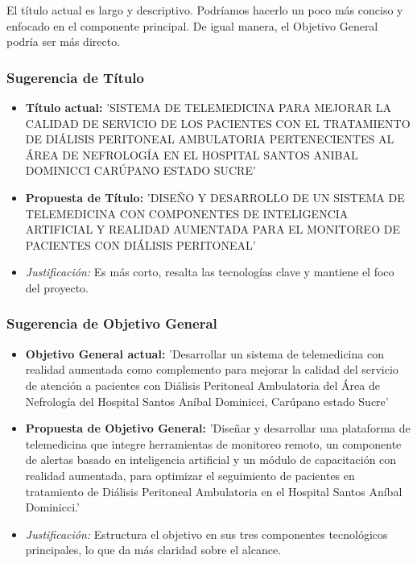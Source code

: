 \documentclass{article}
\begin{document}
El título actual es largo y descriptivo. Podríamos hacerlo un poco más conciso y enfocado en el componente principal. De igual manera, el Objetivo General podría ser más directo.

\subsubsection{Sugerencia de Título}
\begin{itemize}
    \item \textbf{Título actual:} 'SISTEMA DE TELEMEDICINA PARA MEJORAR LA CALIDAD DE SERVICIO DE LOS PACIENTES CON EL TRATAMIENTO DE DIÁLISIS PERITONEAL AMBULATORIA PERTENECIENTES AL ÁREA DE NEFROLOGÍA EN EL HOSPITAL SANTOS ANIBAL DOMINICCI CARÚPANO ESTADO SUCRE'
    \item \textbf{Propuesta de Título:} 'DISEÑO Y DESARROLLO DE UN SISTEMA DE TELEMEDICINA CON COMPONENTES DE INTELIGENCIA ARTIFICIAL Y REALIDAD AUMENTADA PARA EL MONITOREO DE PACIENTES CON DIÁLISIS PERITONEAL'
    \item \textit{Justificación:} Es más corto, resalta las tecnologías clave y mantiene el foco del proyecto.
\end{itemize}

\subsubsection{Sugerencia de Objetivo General}
\begin{itemize}
    \item \textbf{Objetivo General actual:} 'Desarrollar un sistema de telemedicina con realidad aumentada como complemento para mejorar la calidad del servicio de atención a pacientes con Diálisis Peritoneal Ambulatoria del Área de Nefrología del Hospital Santos Aníbal Dominicci, Carúpano estado Sucre'
    \item \textbf{Propuesta de Objetivo General:} 'Diseñar y desarrollar una plataforma de telemedicina que integre herramientas de monitoreo remoto, un componente de alertas basado en inteligencia artificial y un módulo de capacitación con realidad aumentada, para optimizar el seguimiento de pacientes en tratamiento de Diálisis Peritoneal Ambulatoria en el Hospital Santos Aníbal Dominicci.'
    \item \textit{Justificación:} Estructura el objetivo en sus tres componentes tecnológicos principales, lo que da más claridad sobre el alcance.
\end{itemize}
\end{document}
